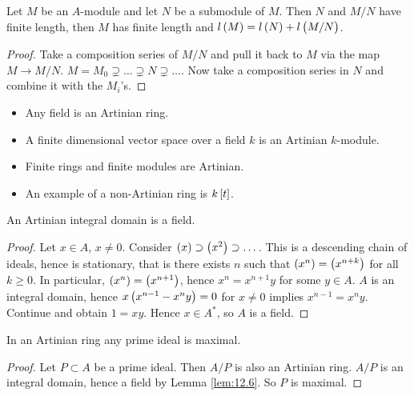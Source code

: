 \begin{proposition}
Let $ M $ be an $ A $-module and let $ N $ be a submodule of $ M $. Then $ N $ and $ M / N $ have finite length, then $ M $ has finite length and $ l\br{M} = l\br{N} + l\br{M / N} $.
\end{proposition}

\begin{proof}
Take a composition series of $ M / N $ and pull it back to $ M $ via the map $ M \to M / N $. $ M = M_0 \supsetneq \dots \supsetneq N \supsetneq \dots $. Now take a composition series in $ N $ and combine it with the $ M_i $'s.
\end{proof}

\pagebreak


\begin{example*}
\hfill
\begin{itemize}
\item Any field is an Artinian ring.
\item A finite dimensional vector space over a field $ k $ is an Artinian $ k $-module.
\item Finite rings and finite modules are Artinian.
\item An example of a non-Artinian ring is $ k\sbr{t} $.
\end{itemize}
\end{example*}

\begin{lemma}
\label{lem:12.6}
An Artinian integral domain is a field.
\end{lemma}

\begin{proof}
Let $ x \in A $, $ x \ne 0 $. Consider $ \br{x} \supset \br{x^2} \supset \dots $. This is a descending chain of ideals, hence is stationary, that is there exists $ n $ such that $ \br{x^n} = \br{x^{n + k}} $ for all $ k \ge 0 $. In particular, $ \br{x^n} = \br{x^{n + 1}} $, hence $ x^n = x^{n + 1}y $ for some $ y \in A $. $ A $ is an integral domain, hence $ x\br{x^{n - 1} - x^ny} = 0 $ for $ x \ne 0 $ implies $ x^{n - 1} = x^ny $. Continue and obtain $ 1 = xy $. Hence $ x \in A^* $, so $ A $ is a field.
\end{proof}

\begin{corollary}
\label{cor:12.7}
In an Artinian ring any prime ideal is maximal.
\end{corollary}

\begin{proof}
Let $ P \subset A $ be a prime ideal. Then $ A / P $ is also an Artinian ring. $ A / P $ is an integral domain, hence a field by Lemma \ref{lem:12.6}. So $ P $ is maximal.
\end{proof}

